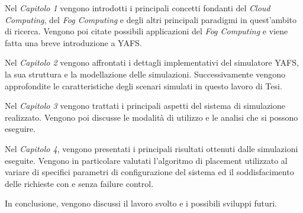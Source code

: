 Nel \textit{Capitolo 1} vengono introdotti i principali concetti fondanti del \textit{Cloud Computing}, del \textit{Fog Computing} e degli altri principali paradigmi in quest'ambito di ricerca. Vengono poi citate possibili applicazioni del \textit{Fog Computing} e viene fatta una breve introduzione a YAFS.

Nel \textit{Capitolo 2} vengono affrontati i dettagli implementativi del simulatore YAFS, la sua struttura e la modellazione delle simulazioni. Successivamente vengono approfondite le caratteristiche degli scenari simulati in questo lavoro di Tesi.

Nel \textit{Capitolo 3} vengono trattati i principali aspetti del sistema di simulazione realizzato. Vengono poi discusse le modalità di utilizzo e le analisi che si possono eseguire.

Nel \textit{Capitolo 4}, vengono presentati i principali risultati ottenuti dalle simulazioni eseguite. Vengono in particolare valutati l'algoritmo di placement utilizzato al variare di specifici parametri di configurazione del sistema ed il soddisfacimento delle richieste con e senza failure control.

In conclusione, vengono discussi il lavoro svolto e i possibili sviluppi futuri.


